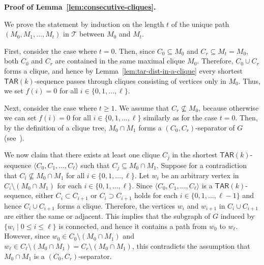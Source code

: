 \documentclass{llncs}
\newcommand{\TAR}[1]{\mathsf{TAR}(#1)}
\newcommand{\ini}{0}
\newcommand{\tar}{r}
\newcommand{\cliq}{C}
\newcounter{one}
\begin{document}
	\noindent
	{\bf Proof of Lemma~\ref{lem:consecutive-cliques}.}

We prove the statement by induction on the length $t$ of the unique path $(M_0, M_1, \ldots, M_t)$ in $\mathcal{T}$ between $M_{0}$ and $M_{t}$.

	First, consider the case where $t = 0$.
	Then, since $\cliq_{\ini} \subseteq M_0$ and $\cliq_{\tar} \subseteq M_t = M_0$, both $\cliq_{\ini}$ and $\cliq_{\tar}$ are contained in the same maximal clique $M_{0}$.
	Therefore, $\cliq_{\ini} \cup \cliq_{\tar}$ forms a clique, and hence by Lemma~\ref{lem:tar-dist-in-a-clique} every shortest $\TAR{k}$-sequence passes through cliques consisting of vertices only in $M_{0}$.
	Thus, we set $f(i) = 0$ for all $i \in \{0, 1, \ldots, \ell\}$.
\medskip

	Next, consider the case where $t \ge 1$. 
	We assume that $\cliq_{\tar} \not\subseteq M_0$, because otherwise we can set $f(i) = 0$ for all $i \in \{0, 1, \ldots, \ell\}$ similarly as for the case $t=0$.
	Then, by the definition of a clique tree, $M_{0} \cap M_{1}$ forms a $(\cliq_{\ini}, \cliq_{\tar})$-separator of $G$ (see~\cite[Lemma 4.2]{BP93chordal}).

	We now claim that there exists at least one clique $\cliq_j$ in the shortest $\TAR{k}$-sequence $\langle \cliq_{\ini}, \cliq_1, \ldots, \cliq_{\ell} \rangle$ such that $\cliq_{j} \subseteq M_{0} \cap M_{1}$.
	Suppose for a contradiction that $\cliq_{i} \not\subseteq M_{0} \cap M_{1}$ for all $i \in \{0, 1, \ldots, \ell\}$.
	Let $w_{i}$ be an arbitrary vertex in $\cliq_{i} \setminus (M_{0} \cap M_{1})$ for each $i \in \{0, 1, \ldots, \ell\}$.
	Since $\langle \cliq_{\ini}, \cliq_1, \ldots, \cliq_{\ell} \rangle$ is a $\TAR{k}$-sequence, either $\cliq_{i} \subset \cliq_{i+1}$ or $\cliq_{i} \supset \cliq_{i+1}$ holds for each $i \in \{0, 1, \ldots, \ell-1\}$ and hence $\cliq_{i} \cup \cliq_{i+1}$ forms a clique.
	Therefore, the vertices $w_{i}$ and $w_{i+1}$ in $\cliq_{i} \cup \cliq_{i+1}$ are either the same or adjacent.
	This implies that the subgraph of $G$ induced by $\{ w_{i} \mid 0 \le i \le \ell\}$ is connected, and hence it contains a path from $w_{0}$ to $w_{\ell}$.
	However, since $w_0 \in \cliq_{0} \setminus (M_{0} \cap M_{1})$ and $w_{\ell} \in \cliq_{\ell} \setminus (M_{0} \cap M_{1}) = \cliq_{\tar} \setminus (M_{0} \cap M_{1})$, this contradicts the assumption that $M_{0} \cap M_{1}$ is a $(\cliq_{0}, \cliq_{\tar})$-separator.
 
\end{document}
